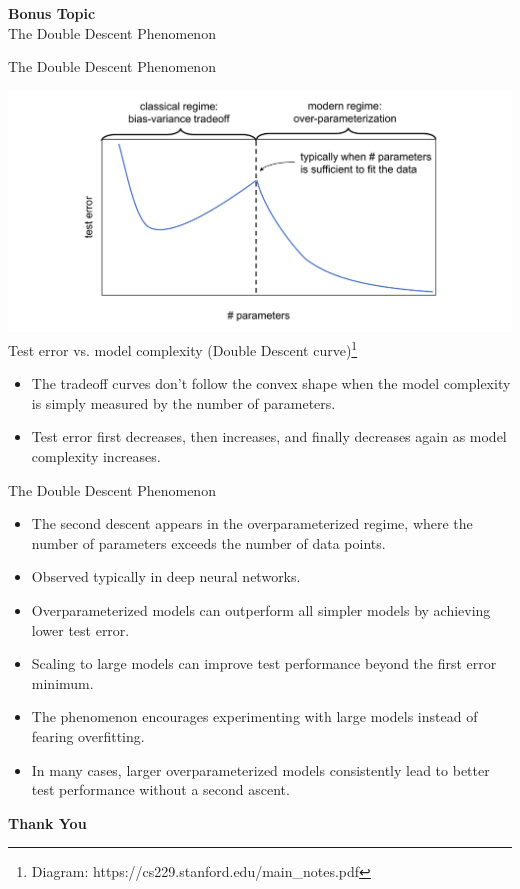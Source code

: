 \documentclass{beamer}
\begin{document}
\begin{frame}{}
    \LARGE \centering \textbf{Bonus Topic} \\ The Double Descent Phenomenon
\end{frame}

\begin{frame}{The Double Descent Phenomenon}
    \begin{center}
        \includegraphics[width=0.7\linewidth]{images/biasvar/DoubleDescent.png} \\
        \scriptsize{Test error vs. model complexity (Double Descent curve)\footnote{\tiny{Diagram: https://cs229.stanford.edu/main\_notes.pdf}}}
    \end{center}

    \begin{itemize}
        \item The tradeoff curves don't follow the convex shape when the model complexity is simply measured by the number of parameters. 
        \item Test error first decreases, then increases, and finally decreases again as model complexity increases.     
    \end{itemize}
\end{frame}

\begin{frame}{The Double Descent Phenomenon}
    \begin{itemize}
        \item The second descent appears in the overparameterized regime, where the number of parameters exceeds the number of data points.
        \item Observed typically in deep neural networks.
        \item Overparameterized models can outperform all simpler models by achieving lower test error.
        \item Scaling to large models can improve test performance beyond the first error minimum.
        \item The phenomenon encourages experimenting with large models instead of fearing overfitting.
        \item In many cases, larger overparameterized models consistently lead to better test performance without a second ascent.
    \end{itemize}
\end{frame}

\begin{frame}{}
    \LARGE \centering \textbf{Thank You }
\end{frame}
\end{document}
